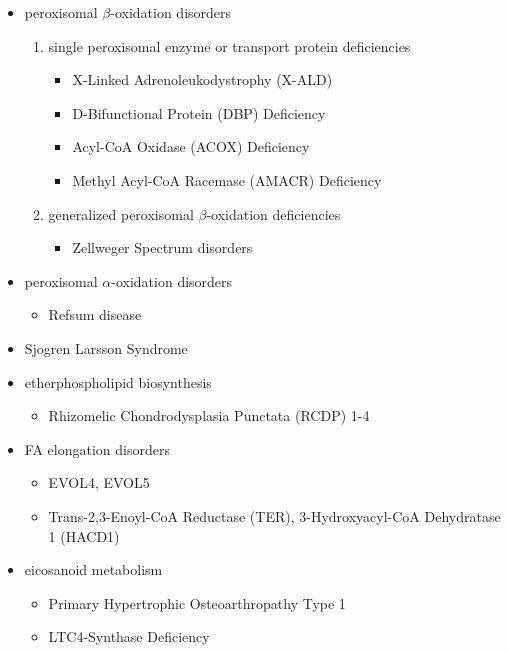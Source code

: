 \documentclass[12pt]{scrartcl}
\begin{document}
\begin{itemize}
\item peroxisomal \(\beta\)-oxidation disorders
\begin{enumerate}
\item single peroxisomal enzyme or transport protein deficiencies
\begin{itemize}
\item X-Linked Adrenoleukodystrophy (X-ALD)
\item D-Bifunctional Protein (DBP) Deficiency
\item Acyl-CoA Oxidase (ACOX) Deficiency
\item Methyl Acyl-CoA Racemase (AMACR) Deficiency
\end{itemize}
\item generalized peroxisomal \(\beta\)-oxidation deficiencies
\begin{itemize}
\item Zellweger Spectrum disorders
\end{itemize}
\end{enumerate}
\item peroxisomal \(\alpha\)-oxidation disorders
\begin{itemize}
\item Refsum disease
\end{itemize}
\item Sjogren Larsson Syndrome
\item etherphospholipid biosynthesis
\begin{itemize}
\item Rhizomelic Chondrodysplasia Punctata (RCDP) 1-4
\end{itemize}
\item FA elongation disorders
\begin{itemize}
\item EVOL4, EVOL5
\item Trans-2,3-Enoyl-CoA Reductase (TER), 3-Hydroxyacyl-CoA Dehydratase 1 (HACD1)
\end{itemize}
\item eicosanoid metabolism
\begin{itemize}
\item Primary Hypertrophic Osteoarthropathy Type 1
\item LTC4-Synthase Deficiency
\end{itemize}
\end{itemize}
\end{document}

